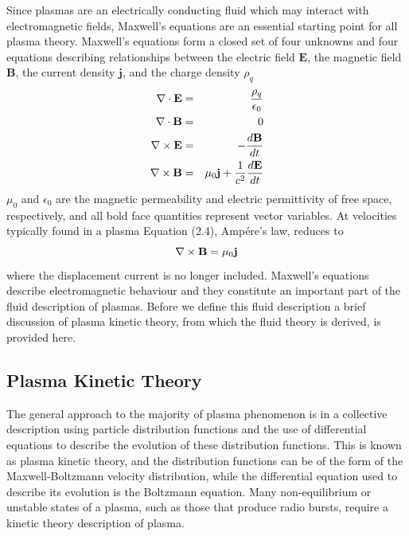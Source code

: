 Since plasmas are an electrically conducting fluid which may interact with electromagnetic fields, Maxwell's equations are an essential starting point for all plasma theory. Maxwell's equations form a closed set of four unknowns and four equations describing relationships between the electric field $\mathbf{E}$, the magnetic field $\mathbf{B}$, the current density $\mathbf{j}$, and the charge density $\rho_q$
\begin{eqnarray}
\nabla \cdot \mathbf{E} &=& \frac{\rho_q}{\epsilon_0} \\
\nabla \cdot \mathbf{B} &=& 0 \\
{\bf \nabla} \times{\mathbf{E}} &=& - \frac{d\mathbf{B}}{dt} \\
{\bf \nabla} \times{\mathbf{B}} &=& \mu_0 \mathbf{j} + \frac{1}{c^2}\frac{d\mathbf{E}}{dt} 
\end{eqnarray}
$\mu_0$ and $\epsilon_0$ are the magnetic permeability and electric permittivity of free space, respectively, and all bold face quantities represent vector variables. At velocities typically found in a plasma Equation (2.4), Amp\'{e}re's law, reduces to
\begin{equation}
{\bf \nabla} \times{\mathbf{B}} = \mu_0 \mathbf{j}
\label{eqn:amperes_law}
\end{equation}
where the displacement current is no longer included. Maxwell's equations describe electromagnetic behaviour and they constitute an important part of the fluid description of plasmas. Before we define this fluid description a brief discussion of plasma kinetic theory, from which the fluid theory is derived, is provided here.

\subsection{Plasma Kinetic Theory}\label{sec:11}

The general approach to the majority of plasma phenomenon is in a collective description using particle distribution functions and the use of differential equations to describe the evolution of these distribution functions. This is known as plasma kinetic theory, and the distribution functions can be of the form of the Maxwell-Boltzmann velocity distribution, while the differential equation used to describe its evolution is the Boltzmann equation. Many non-equilibrium or unstable states of a plasma, such as those that produce radio bursts, require a kinetic theory description of plasma. 

